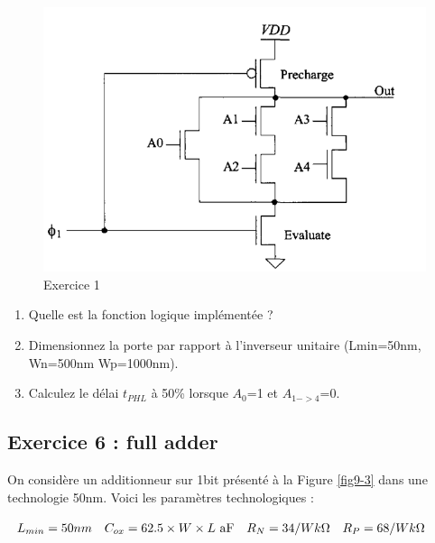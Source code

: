 \documentclass[paper=a4, fontsize=11pt]{article} %
\numberwithin{equation}{section} %
\numberwithin{figure}{section} %
\numberwithin{table}{section} %
\begin{document}
\begin{figure}[!htbp]
   \centering
   \includegraphics[width=14cm]{figure/fig9-2.png}
   \caption{Exercice 1}
   \label{fig9-2}
\end{figure}

\begin{enumerate}
\item Quelle est la fonction logique implémentée ?
\item Dimensionnez la porte par rapport à l'inverseur unitaire (Lmin=50nm, Wn=500nm Wp=1000nm).
\item Calculez le délai $t_{PHL}$ à 50\% lorsque $A_0$=1 et $A_{1->4}$=0.
\end{enumerate}

\subsection*{Exercice 6 : full adder}

On considère un additionneur sur 1bit présenté à la Figure \ref{fig9-3} dans une technologie 50nm. Voici les paramètres technologiques :
\begin{center} $ \begin{array}{l l l l} L_{min} = 50nm & C_{ox} = 62.5\times W \times L\text{ aF} & R_N=34/W k \Omega& R_P=68/W k\Omega\\ \end{array}$\end{center}
\end{document}
